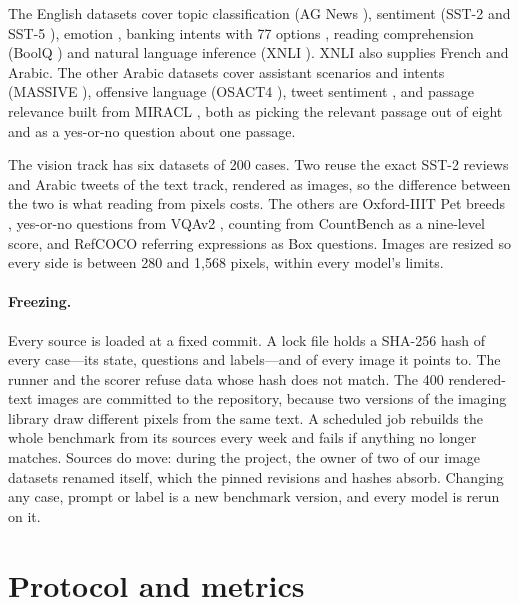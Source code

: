 \documentclass[11pt]{article}
\begin{document}
The English datasets cover topic classification (AG News \citep{zhang2015character}), sentiment (SST-2 and SST-5
\citep{socher2013recursive}), emotion \citep{saravia2018carer}, banking intents with 77 options
\citep{casanueva2020efficient}, reading comprehension (BoolQ \citep{clark2019boolq}) and natural language inference
(XNLI \citep{conneau2018xnli}). XNLI also supplies French and Arabic. The other Arabic datasets cover assistant
scenarios and intents (MASSIVE \citep{fitzgerald2023massive}), offensive language (OSACT4 \citep{mubarak2020osact4}),
tweet sentiment \citep{barbieri2022xlmt}, and passage relevance built from MIRACL \citep{zhang2023miracl}, both as
picking the relevant passage out of eight and as a yes-or-no question about one passage.

The vision track has six datasets of 200 cases. Two reuse the exact SST-2 reviews and Arabic tweets of the text
track, rendered as images, so the difference between the two is what reading from pixels costs. The others are
Oxford-IIIT Pet breeds \citep{parkhi2012cats}, yes-or-no questions from VQAv2 \citep{goyal2017making}, counting from
CountBench \citep{paiss2023teaching} as a nine-level score, and RefCOCO referring expressions \citep{yu2016modeling}
as Box questions. Images are resized so every side is between 280 and 1{,}568 pixels, within every model's limits.

\paragraph{Freezing.} Every source is loaded at a fixed commit. A lock file holds a SHA-256 hash of every case---its
state, questions and labels---and of every image it points to. The runner and the scorer refuse data whose hash does
not match. The 400 rendered-text images are committed to the repository, because two versions of the imaging library
draw different pixels from the same text. A scheduled job rebuilds the whole benchmark from its sources every week
and fails if anything no longer matches. Sources do move: during the project, the owner of two of our image datasets
renamed itself, which the pinned revisions and hashes absorb. Changing any
case, prompt or label is a new benchmark version, and every model is rerun on it.



\section{Protocol and metrics}\label{sec:protocol}
\end{document}
